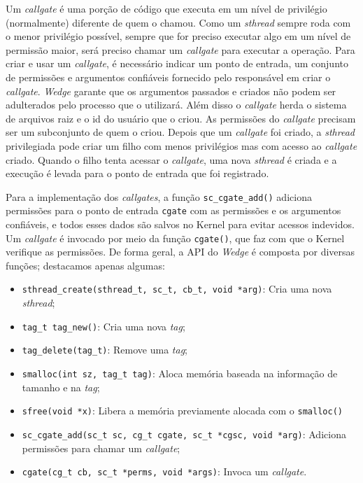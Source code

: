 Um \emph{callgate} é uma porção de código que executa em um nível de privilégio
(normalmente) diferente de quem o chamou. Como um \emph{sthread} sempre roda
com o menor privilégio possível, sempre que for preciso executar algo em um
nível de permissão maior, será preciso chamar um \emph{callgate} para executar
a operação. Para criar e usar um \emph{callgate}, é necessário indicar um ponto
de entrada, um conjunto de permissões e argumentos confiáveis fornecido pelo
responsável em criar o \emph{callgate}. \emph{Wedge} garante que os
argumentos passados e criados não podem ser adulterados pelo processo que o
utilizará. Além disso o \emph{callgate} herda o sistema de arquivos raiz e o id
do usuário que o criou. As permissões do \emph{callgate} precisam ser um
subconjunto de quem o criou. Depois que um \emph{callgate} foi criado, a
\emph{sthread} privilegiada pode criar um filho com menos privilégios mas com
acesso ao \emph{callgate} criado. Quando o filho tenta acessar o
\emph{callgate}, uma nova \emph{sthread} é criada e a execução é levada para o ponto
de entrada que foi registrado.

Para a implementação dos \emph{callgates}, a função \texttt{sc\_cgate\_add()}
adiciona permissões para o ponto de entrada \texttt{cgate} com as permissões e
os argumentos confiáveis, e todos esses dados são salvos no Kernel para evitar
acessos indevidos. Um \emph{callgate} é invocado por meio da função
\texttt{cgate()}, que faz com que o Kernel verifique as permissões. De forma
geral, a API do \emph{Wedge} é composta por diversas funções; destacamos apenas
algumas:

\begin{itemize}
  \item \texttt{sthread\_create(sthread\_t, sc\_t, cb\_t, void *arg)}: Cria
uma nova \emph{sthread};
  \item \texttt{tag\_t tag\_new()}: Cria uma nova \emph{tag};
  \item \texttt{tag\_delete(tag\_t)}: Remove uma \emph{tag};
  \item \texttt{smalloc(int sz, tag\_t tag)}: Aloca memória baseada na
informação de tamanho e na \emph{tag};
  \item \texttt{sfree(void *x)}: Libera a memória previamente alocada com o
\texttt{smalloc()}
  \item \texttt{sc\_cgate\_add(sc\_t sc, cg\_t cgate, sc\_t *cgsc, void *arg)}:
Adiciona permissões para chamar um \emph{callgate};
  \item \texttt{cgate(cg\_t cb, sc\_t *perms, void *args)}: Invoca um
\emph{callgate}.
\end{itemize}

